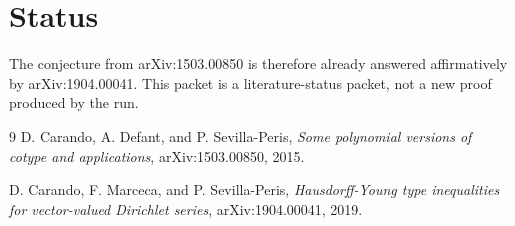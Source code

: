 \documentclass[11pt]{article}
\begin{document}
\section*{Status}

The conjecture from arXiv:1503.00850 is therefore already answered affirmatively by arXiv:1904.00041. This packet is a literature-status packet, not a new proof produced by the run.

\begin{thebibliography}{9}
D. Carando, A. Defant, and P. Sevilla-Peris,
\emph{Some polynomial versions of cotype and applications},
arXiv:1503.00850, 2015.

D. Carando, F. Marceca, and P. Sevilla-Peris,
\emph{Hausdorff-Young type inequalities for vector-valued Dirichlet series},
arXiv:1904.00041, 2019.
\end{thebibliography}
\end{document}
